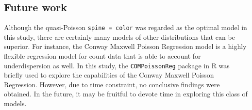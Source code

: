 \documentclass[a4paper, 12pt]{article}
\begin{document}
\subsection{Future work}
Although the quasi-Poisson \texttt{spine = color} was regarded as the optimal model in this study, there are certainly many models of other distributions that can be superior. For instance, the Conway Maxwell Poisson Regression model \cite{sellers_borle_shmueli_2011} is a highly flexible regression model for count data that is able to account for underdispersion as well. In this study, the \texttt{COMPoissonReg} package in R was briefly used to explore the capabilities of the Conway Maxwell Poisson Regression. However, due to time constraint, no conclusive findings were obtained. In the future, it may be fruitful to devote time in exploring this class of models.  



\end{document}
